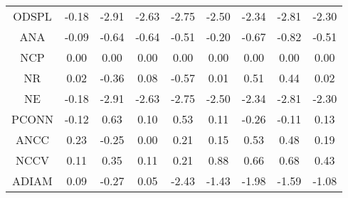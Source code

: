 \documentclass[11pt,a4paper]{report}
\begin{document}
\begin{longtable}{ | c || c | c | c | c | c | c | c || c |}
ODSPL &  \cellcolor[HTML]{FFF7F7} -0.18 &  \cellcolor[HTML]{FFB7B7} -2.91 &  \cellcolor[HTML]{FFBFBF} -2.63 &  \cellcolor[HTML]{FFB7B7} -2.75 &  \cellcolor[HTML]{FFBFBF} -2.50 &  \cellcolor[HTML]{FFC7C7} -2.34 &  \cellcolor[HTML]{FFB7B7} -2.81 &  \cellcolor[HTML]{FFC7C7} -2.30 \\
ANA &  \cellcolor[HTML]{FFFFFF} -0.09 &  \cellcolor[HTML]{FFEFEF} -0.64 &  \cellcolor[HTML]{FFEFEF} -0.64 &  \cellcolor[HTML]{FFEFEF} -0.51 &  \cellcolor[HTML]{FFF7F7} -0.20 &  \cellcolor[HTML]{FFEFEF} -0.67 &  \cellcolor[HTML]{FFE7E7} -0.82 &  \cellcolor[HTML]{FFEFEF} -0.51 \\
NCP &  \cellcolor[HTML]{FFFFFF} 0.00 &  \cellcolor[HTML]{FFFFFF} 0.00 &  \cellcolor[HTML]{FFFFFF} 0.00 &  \cellcolor[HTML]{FFFFFF} 0.00 &  \cellcolor[HTML]{FFFFFF} 0.00 &  \cellcolor[HTML]{FFFFFF} 0.00 &  \cellcolor[HTML]{FFFFFF} 0.00 &  \cellcolor[HTML]{FFFFFF} 0.00 \\
NR &  \cellcolor[HTML]{FFFFFF} 0.02 &  \cellcolor[HTML]{FFF7F7} -0.36 &  \cellcolor[HTML]{FFFFFF} 0.08 &  \cellcolor[HTML]{FFEFEF} -0.57 &  \cellcolor[HTML]{FFFFFF} 0.01 &  \cellcolor[HTML]{EFEFFF} 0.51 &  \cellcolor[HTML]{F7F7FF} 0.44 &  \cellcolor[HTML]{FFFFFF} 0.02 \\
NE &  \cellcolor[HTML]{FFF7F7} -0.18 &  \cellcolor[HTML]{FFB7B7} -2.91 &  \cellcolor[HTML]{FFBFBF} -2.63 &  \cellcolor[HTML]{FFB7B7} -2.75 &  \cellcolor[HTML]{FFBFBF} -2.50 &  \cellcolor[HTML]{FFC7C7} -2.34 &  \cellcolor[HTML]{FFB7B7} -2.81 &  \cellcolor[HTML]{FFC7C7} -2.30 \\
PCONN &  \cellcolor[HTML]{FFFFFF} -0.12 &  \cellcolor[HTML]{EFEFFF} 0.63 &  \cellcolor[HTML]{FFFFFF} 0.10 &  \cellcolor[HTML]{EFEFFF} 0.53 &  \cellcolor[HTML]{FFFFFF} 0.11 &  \cellcolor[HTML]{FFF7F7} -0.26 &  \cellcolor[HTML]{FFFFFF} -0.11 &  \cellcolor[HTML]{FFFFFF} 0.13 \\
ANCC &  \cellcolor[HTML]{F7F7FF} 0.23 &  \cellcolor[HTML]{FFF7F7} -0.25 &  \cellcolor[HTML]{FFFFFF} 0.00 &  \cellcolor[HTML]{F7F7FF} 0.21 &  \cellcolor[HTML]{FFFFFF} 0.15 &  \cellcolor[HTML]{EFEFFF} 0.53 &  \cellcolor[HTML]{EFEFFF} 0.48 &  \cellcolor[HTML]{F7F7FF} 0.19 \\
NCCV &  \cellcolor[HTML]{FFFFFF} 0.11 &  \cellcolor[HTML]{F7F7FF} 0.35 &  \cellcolor[HTML]{FFFFFF} 0.11 &  \cellcolor[HTML]{F7F7FF} 0.21 &  \cellcolor[HTML]{E7E7FF} 0.88 &  \cellcolor[HTML]{EFEFFF} 0.66 &  \cellcolor[HTML]{EFEFFF} 0.68 &  \cellcolor[HTML]{F7F7FF} 0.43 \\
ADIAM &  \cellcolor[HTML]{FFFFFF} 0.09 &  \cellcolor[HTML]{FFF7F7} -0.27 &  \cellcolor[HTML]{FFFFFF} 0.05 &  \cellcolor[HTML]{FFBFBF} -2.43 &  \cellcolor[HTML]{FFDFDF} -1.43 &  \cellcolor[HTML]{FFCFCF} -1.98 &  \cellcolor[HTML]{FFD7D7} -1.59 &  \cellcolor[HTML]{FFE7E7} -1.08 \\

\end{longtable}
\end{document}
